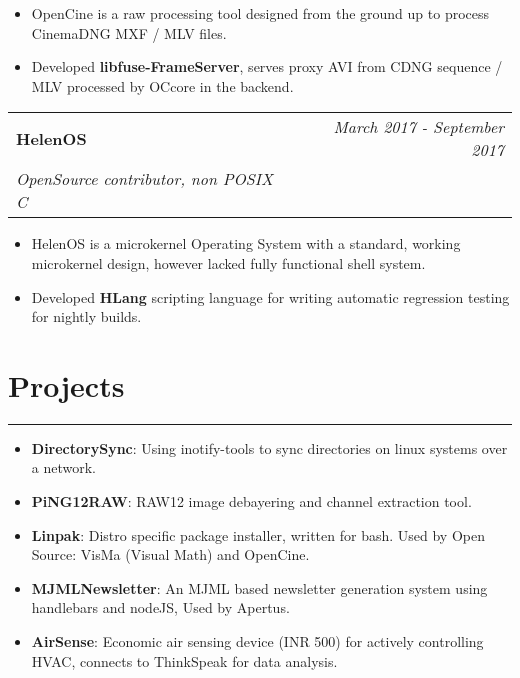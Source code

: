 \documentclass[9pt, a4paper]{article}
\begin{document}
\begin{itemize}
	\itemsep0em
	\item OpenCine is a raw processing tool designed from the ground up to process CinemaDNG MXF / MLV files.
	\item Developed \textbf{libfuse-FrameServer}, serves proxy AVI from CDNG sequence / MLV processed by OCcore in the backend.
\end{itemize}

\vspace{6px}
\hspace{5px}
\begin{tabularx}{\textwidth}{X r}
	\textbf{HelenOS} & \textit{March 2017 - September 2017} \\
	\textit{\small OpenSource contributor, non POSIX C} & \\
\end{tabularx}

\begin{itemize}
	\itemsep0em
	\item HelenOS is a microkernel Operating System with a standard, working microkernel design, however lacked fully functional shell system.
	\item Developed \textbf{HLang} scripting language for writing automatic regression testing for nightly builds.
\end{itemize}

\section*{Projects}
\vspace{-8px}
\hrule
\vspace{4px}
\hspace{5px}
\begin{itemize}
	\item \textbf{DirectorySync}: Using inotify-tools to sync directories on linux systems over a network.
	\item \textbf{PiNG12RAW}: RAW12 image debayering and channel extraction tool.
	\item \textbf{Linpak}: Distro specific package installer, written for bash. Used by Open Source: VisMa (Visual Math) and OpenCine.
	\item \textbf{MJMLNewsletter}: An MJML based newsletter generation system using handlebars and nodeJS, Used by Apertus.
	\item \textbf{AirSense}: Economic air sensing device (INR 500) for actively controlling HVAC, connects to ThinkSpeak for data analysis.
\end{itemize}
\end{document}
